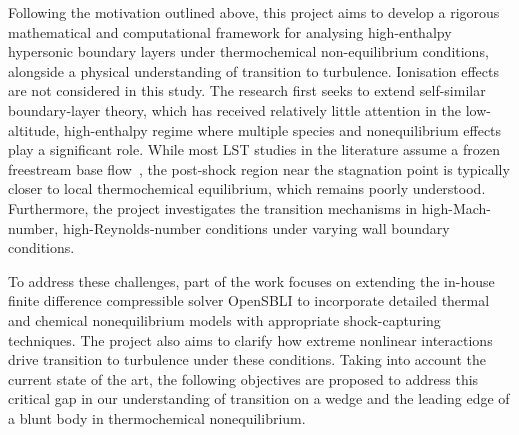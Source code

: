 Following the motivation outlined above, this project aims to develop a rigorous mathematical and computational framework for analysing high-enthalpy hypersonic boundary layers under thermochemical non-equilibrium conditions, alongside a physical understanding of transition to turbulence. Ionisation effects are not considered in this study. The research first seeks to extend self-similar boundary-layer theory, which has received relatively little attention in the low-altitude, high-enthalpy regime where multiple species and nonequilibrium effects play a significant role. While most \gls{LST} studies in the literature assume a frozen freestream base flow~\citep{miromiroThesis}, the post-shock region near the stagnation point is typically closer to local thermochemical equilibrium, which remains poorly understood. Furthermore, the project investigates the transition mechanisms in high-Mach-number, high-Reynolds-number conditions under varying wall boundary conditions.

To address these challenges, part of the work focuses on extending the in-house finite difference compressible solver OpenSBLI to incorporate detailed thermal and chemical nonequilibrium models with appropriate shock-capturing techniques. The project also aims to clarify how extreme nonlinear interactions drive transition to turbulence under these conditions. Taking into account the current state of the art, the following objectives are proposed to address this critical gap in our understanding of transition on a wedge and the leading edge of a blunt body in thermochemical nonequilibrium.






    
